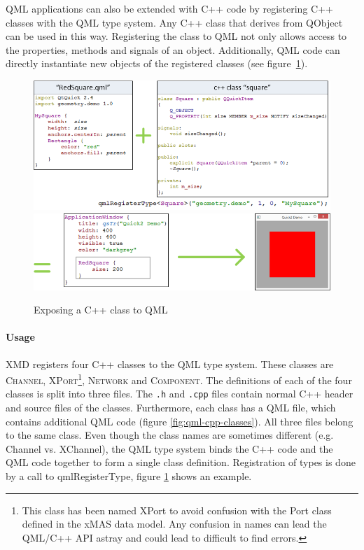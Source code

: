 QML applications can also be extended with C++ code by registering C++ classes
with the QML type system. Any C++ class that derives from QObject can be used
in this way. Registering the class to QML not only allows access to the properties,
methods and signals of an object. Additionally, QML code can directly instantiate
new objects of the registered classes (see figure~\ref{fig:register-qml}).

\begin{figure}
    \includegraphics[width=\textwidth]{qml1}
    \includegraphics[width=\textwidth]{qml2}
    \caption{Exposing a C++ class to QML}
    \label{fig:register-qml}
\end{figure}

\paragraph{Usage}XMD registers four C++ classes to the QML type system. These classes
are \textsc{Channel}, \textsc{XPort}\footnote{This class has been named XPort to
avoid confusion with the Port class defined in the xMAS data model. Any confusion
in names can lead the QML/C++ API astray and could lead to difficult to find errors.}, 
\textsc{Network} and \textsc{Component}. 
The definitions of each of the four classes is split into three files. 
The {\tt .h} and {\tt .cpp} files contain normal C++ header and source files of the 
classes. Furthermore, each class has a QML file, which contains
additional QML code (figure \ref{fig:qml-cpp-classes}). All three files belong to
the same class. Even though the class names are sometimes different (e.g. Channel vs.
XChannel), the QML type system binds the C++ code and the QML code together to form a
single class definition. Registration of types is done by a call to qmlRegisterType,
figure \ref{fig:register-qml} shows an example.

